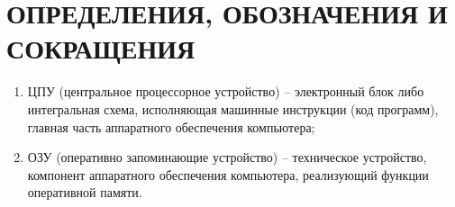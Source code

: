 \section*{ОПРЕДЕЛЕНИЯ, ОБОЗНАЧЕНИЯ И СОКРАЩЕНИЯ}

\begin{enumerate}
	\item ЦПУ (центральное процессорное устройство)  -- электронный блок либо интегральная схема, исполняющая машинные инструкции (код программ), главная часть аппаратного обеспечения компьютера;

	\item ОЗУ (оперативно запоминающие устройство) -- техническое устройство, компонент аппаратного обеспечения компьютера, реализующий функции оперативной памяти.
\end{enumerate}

\pagebreak